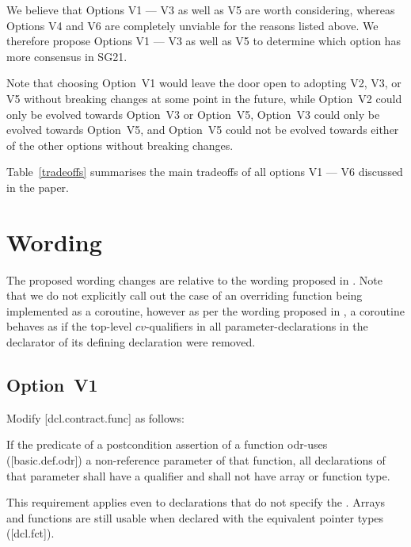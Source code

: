 We believe that Options V1 --- V3 as well as V5 are worth considering, whereas Options V4 and V6 are completely unviable for the reasons listed above. We therefore propose Options V1 --- V3 as well as V5 to determine which option has more consensus in SG21. 

Note that choosing Option~V1 would leave the door open to adopting V2, V3, or V5 without breaking changes at some point in the future, while Option~V2 could only be evolved towards Option~V3 or Option~V5, Option~V3 could only be evolved towards Option~V5, and Option~V5 could not be evolved towards either of the other options without breaking changes.

Table~\ref{tradeoffs} summarises the main tradeoffs of all options V1 --- V6 discussed in the paper.

\section{Wording}

The proposed wording changes are relative to the wording proposed in \cite{P2900R10}. Note that we do not explicitly call out the case of an overriding function being implemented as a coroutine, however as per the wording proposed in \cite{P2900R10}, a coroutine behaves as if the top-level $cv$-qualifiers in all parameter-declarations in the declarator of its defining declaration were removed.

\subsection*{Option~V1}

Modify [dcl.contract.func] as follows:

\begin{adjustwidth}{0.5cm}{0.5cm}
If the predicate of a postcondition assertion of a function odr-uses ([basic.def.odr]) a
non-reference parameter of that function, all declarations of that parameter shall have a  qualifier and shall not have array or function type.
\begin{note}
This requirement applies even to declarations
that do not specify the . Arrays and functions are still usable when declared with the equivalent pointer types ([dcl.fct]).
\end{note}
\begin{example}
\tcode{[...]}
\end{example}
\end{adjustwidth}


